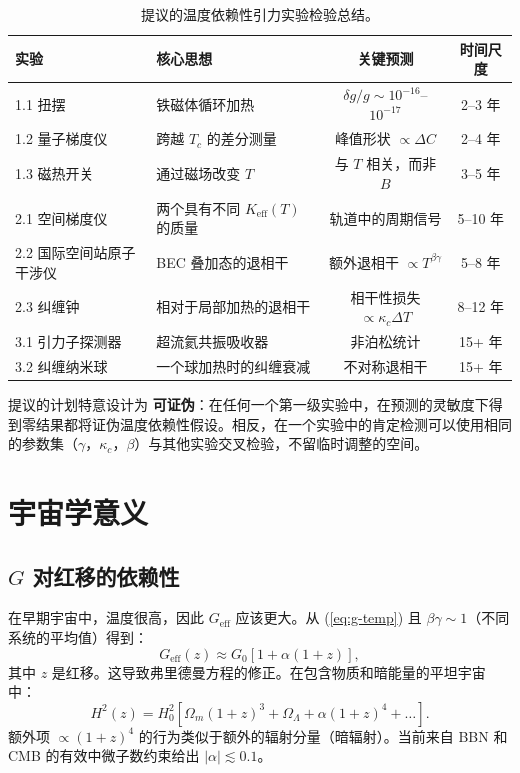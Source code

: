 \documentclass[12pt]{article}
\theoremstyle{remark}
\newcommand{\Keff}{K_{\mathrm{eff}}}
\begin{document}
	\begin{table}[htbp]
		\centering
		\caption{提议的温度依赖性引力实验检验总结。}
		\label{tab:experiment-summary}
		\small
		\begin{tabularx}{\textwidth}{l X c c}
			\toprule
			\textbf{实验} & \textbf{核心思想} & \textbf{关键预测} & \textbf{时间尺度} \\
			\midrule
			1.1 扭摆 & 铁磁体循环加热 & $\delta g/g \sim 10^{-16}$–$10^{-17}$ & 2–3 年 \\
			1.2 量子梯度仪 & 跨越 $T_c$ 的差分测量 & 峰值形状 $\propto \Delta C$ & 2–4 年 \\
			1.3 磁热开关 & 通过磁场改变 $T$ & 与 $T$ 相关，而非 $B$ & 3–5 年 \\
			2.1 空间梯度仪 & 两个具有不同 $\Keff(T)$ 的质量 & 轨道中的周期信号 & 5–10 年 \\
			2.2 国际空间站原子干涉仪 & BEC 叠加态的退相干 & 额外退相干 $\propto T^{\beta\gamma}$ & 5–8 年 \\
			2.3 纠缠钟 & 相对于局部加热的退相干 & 相干性损失 $\propto \kappa_c \Delta T$ & 8–12 年 \\
			3.1 引力子探测器 & 超流氦共振吸收器 & 非泊松统计 & 15+ 年 \\
			3.2 纠缠纳米球 & 一个球加热时的纠缠衰减 & 不对称退相干 & 15+ 年 \\
			\bottomrule
		\end{tabularx}
	\end{table}
	
	提议的计划特意设计为 \textbf{可证伪}：在任何一个第一级实验中，在预测的灵敏度下得到零结果都将证伪温度依赖性假设。相反，在一个实验中的肯定检测可以使用相同的参数集（$\gamma$，$\kappa_c$，$\beta$）与其他实验交叉检验，不留临时调整的空间。
	
	
	\section{宇宙学意义}
	\label{sec:cosmo}
	
	\subsection{$G$ 对红移的依赖性}
	\label{subsec:cosmo-gz}
	
	在早期宇宙中，温度很高，因此 $G_{\text{eff}}$ 应该更大。从 (\ref{eq:g-temp}) 且 $\beta\gamma \sim 1$（不同系统的平均值）得到：
	\begin{equation}
		G_{\text{eff}}(z) \approx G_0 \left[ 1 + \alpha (1+z) \right],
		\label{eq:gz}
	\end{equation}
	其中 $z$ 是红移。这导致弗里德曼方程的修正。在包含物质和暗能量的平坦宇宙中：
	\begin{equation}
		H^2(z) = H_0^2 \left[ \Omega_m (1+z)^3 + \Omega_\Lambda + \alpha (1+z)^4 + \dots \right].
		\label{eq:friedmann}
	\end{equation}
	额外项 $\propto (1+z)^4$ 的行为类似于额外的辐射分量（暗辐射）。当前来自 BBN 和 CMB 的有效中微子数约束给出 $|\alpha| \lesssim 0.1$。
	
\end{document}
